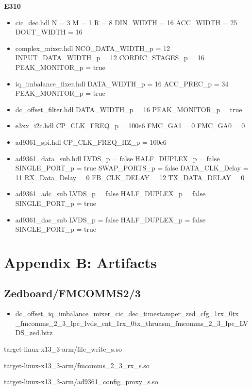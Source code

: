 \begin{minipage}[t]{.5\textwidth}
	\textbf{E310}
	\begin{itemize}
		\item cic\_dec.hdl
			\subitem N = 3
			\subitem M = 1
			\subitem R = 8
			\subitem DIN\_WIDTH = 16
			\subitem ACC\_WIDTH = 25
			\subitem DOUT\_WIDTH = 16
		\item complex\_mixer.hdl
			\subitem NCO\_DATA\_WIDTH\_p = 12
			\subitem INPUT\_DATA\_WIDTH\_p = 12
			\subitem CORDIC\_STAGES\_p = 16
			\subitem PEAK\_MONITOR\_p = true
		\item iq\_imbalance\_fixer.hdl
			\subitem DATA\_WIDTH\_p = 16
			\subitem ACC\_PREC\_p = 34
			\subitem PEAK\_MONITOR\_p = true
		\item dc\_offset\_filter.hdl
			\subitem DATA\_WIDTH\_p = 16
			\subitem PEAK\_MONITOR\_p = true
		\item e3xx\_i2c.hdl
			\subitem CP\_CLK\_FREQ\_p = 100e6
			\subitem FMC\_GA1 = 0
			\subitem FMC\_GA0 = 0
		\item ad9361\_spi.hdl
			\subitem CP\_CLK\_FREQ\_HZ\_p = 100e6
		\item ad9361\_data\_sub.hdl
			\subitem LVDS\_p = false
			\subitem HALF\_DUPLEX\_p = false
			\subitem SINGLE\_PORT\_p = true
			\subitem SWAP\_PORTS\_p = false
			\subitem DATA\_CLK\_Delay = 11
			\subitem RX\_Data\_Delay = 0
			\subitem FB\_CLK\_DELAY = 12
			\subitem TX\_DATA\_DELAY = 0
		\item ad9361\_adc\_sub
			\subitem LVDS\_p = false
			\subitem HALF\_DUPLEX\_p = false
			\subitem SINGLE\_PORT\_p = true
		\item ad9361\_dac\_sub
			\subitem LVDS\_p = false
			\subitem HALF\_DUPLEX\_p = false
			\subitem SINGLE\_PORT\_p = true
	\end{itemize}
\end{minipage} \newpage
\section{Appendix B: Artifacts}
\subsection{Zedboard/FMCOMMS2/3}
	\begin{itemize}
	\item dc\_offset\_iq\_imbalance\_mixer\_cic\_dec\_timestamper\_zed\_cfg\_1rx\_0tx \\ 
\_fmcomms\_2\_3\_lpc\_lvds\_cnt\_1rx\_0tx\_thruasm\_fmcomms\_2\_3\_lpc\_LVDS\_zed.bitz
	\end{itemize}
	\begin{itemize}
	\begin{minipage}[t]{.5\textwidth}
	\item target-linux-x13\_3-arm/file\_write\_s.so
	\item target-linux-x13\_3-arm/fmcomms\_2\_3\_rx\_s.so
	\item target-linux-x13\_3-arm/ad9361\_config\_proxy\_s.so
	\end{minipage}
	\end{itemize}
